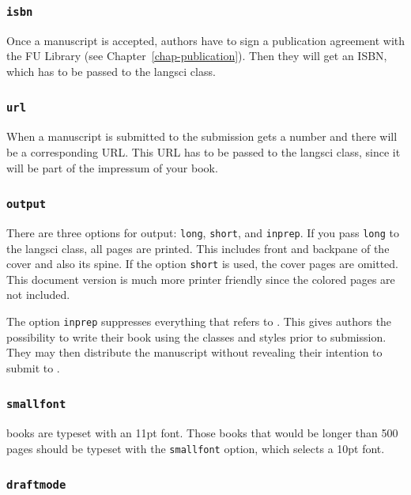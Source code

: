 \subsubsection{\texttt{isbn}}

Once a manuscript is accepted, authors have to sign a publication agreement with the FU Library (see
Chapter~\ref{chap-publication}). Then they will get an ISBN, which has to be passed to the langsci class.

\subsubsection{\texttt{url}}

When a manuscript is submitted to \lsp the submission gets a number and there will be a
corresponding URL. This URL has to be passed to the langsci class, since it will be part of the
impressum of your book.

\subsubsection{\texttt{output}}

There are three options for output: \texttt{long}, \texttt{short}, and \texttt{inprep}. If you pass
\texttt{long} to the langsci class, all pages are printed. This includes front and backpane of the
cover and also its spine. If the option \texttt{short} is used, the cover pages are omitted. This
document version is much more printer friendly since the colored pages are not included.

The option \texttt{inprep} suppresses everything that refers to \lsp. This gives authors the
possibility to write their book using the \lsp classes and styles prior to submission. They may then
distribute the manuscript without revealing their intention to submit to \lsp.

\subsubsection{\texttt{smallfont}}

\lsp{} books are typeset with an 11pt font. Those books that would be longer than 500 pages should be
typeset with the \texttt{smallfont} option, which selects a 10pt font.

\subsubsection{\texttt{draftmode}}

